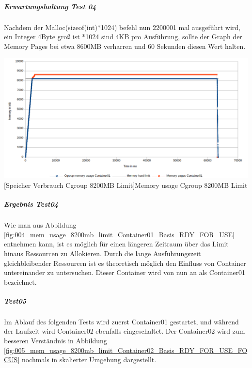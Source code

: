 \subparagraph{Erwartungshaltung Test 04}
Nachdem der Malloc(sizeof(int)*1024) befehl nun 2200001 mal ausgeführt wird, ein Integer 4Byte groß ist *1024 sind 4KB pro Ausführung, sollte der Graph der Memory Pages bei etwa 8600MB verharren und 60 Sekunden diesen Wert halten.

\vspace{1em}
\begin{minipage}{\linewidth}
	\centering
	\includegraphics[width=1\linewidth]{pics/004_mem_usage_8200mb_limit_Container01_Basis_RDY_FOR_USE.png}
	[Speicher Verbrauch Cgroup 8200MB Limit]{Memory usage Cgroup 8200MB Limit}
	\label{fig:004_mem_usage_8200mb_limit_Container01_Basis_RDY_FOR_USE}
\end{minipage}

\subparagraph{Ergebnis Test04}
Wie man aus Abbildung \ref{fig:004_mem_usage_8200mb_limit_Container01_Basis_RDY_FOR_USE} entnehmen kann, ist es möglich für einen längeren Zeitraum über das Limit hinaus Ressourcen zu Allokieren. Durch die lange Ausführungszeit gleichbleibender Ressourcen ist es theoretisch möglich den Einfluss von Container untereinander zu untersuchen. Dieser Container wird von nun an als Container01 bezeichnet.

\subparagraph{Test05}
Im Ablauf des folgenden Tests wird zuerst Container01 gestartet, und während der Laufzeit wird Container02 ebenfalls eingeschaltet. Der Container02 wird zum besseren Verständnis in Abbildung \ref{fig:005_mem_usage_8200mb_limit_Container02_Basis_RDY_FOR_USE_FOCUS} nochmals in skalierter Umgebung dargestellt. 


